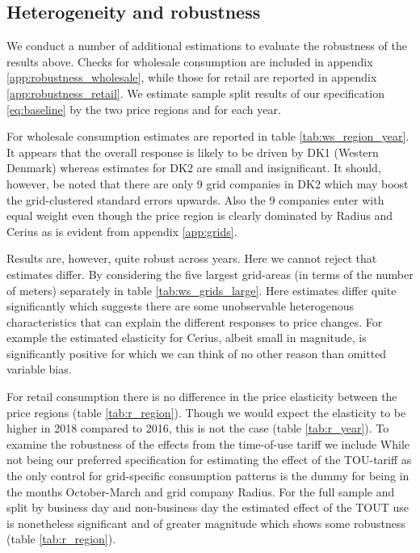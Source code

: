 \subsection{Heterogeneity and robustness}
\label{subsec:r_robustness}
\begin{comment}
Heterogeneous effects
\begin{figure}[H]
  \centering
  \caption{Wholesale elasticity by hour}
  \label{fig:ws_elasticity_hour}
\end{figure}

\begin{figure}[H]
  \centering
  \caption{Wholesale peak-elasticity by log grid size}
  \label{fig:ws_elasticity_grid}
\end{figure}
\end{comment}
We conduct a number of additional estimations to evaluate the robustness of the results above. Checks for wholesale consumption are included in appendix \ref{app:robustness_wholesale}, while those for retail are reported in appendix \ref{app:robustness_retail}. We estimate sample split results of our specification \eqref{eq:baseline} by the two price regions and for each year.
\bigskip\par
For wholesale consumption estimates are reported in table \ref{tab:ws_region_year}. It appears that the overall response is likely to be driven by DK1 (Western Denmark) whereas estimates for DK2 are small and insignificant. It should, however, be noted that there are only 9 grid companies in DK2 which may boost the grid-clustered standard errors upwards. Also the 9 companies enter with equal weight even though the price region is clearly dominated by Radius and Cerius as is evident from appendix \ref{app:grids}.
\par
Results are, however, quite robust across years. Here we cannot reject that estimates differ. By considering the five largest grid-areas (in terms of the number of meters) separately in table \ref{tab:ws_grids_large}. Here estimates differ quite significantly which suggests there are some unobservable heterogenous characteristics that can explain the different responses to price changes. For example the estimated elasticity for Cerius, albeit small in magnitude, is significantly positive for which we can think of no other reason than omitted variable bias.
\par %
For retail consumption there is no difference in the price elasticity between the price regions (table \ref{tab:r_region}). Though we would expect the elasticity to be higher in 2018 compared to 2016, this is not the case (table \ref{tab:r_year}). To examine the robustness of the effects from the time-of-use tariff we include While not being our preferred specification for estimating the effect of the TOU-tariff as the only control for grid-specific consumption patterns is the dummy for being in the months October-March and grid company Radius. For the full sample and split by business day and non-business day the estimated effect of the TOUT use is nonetheless significant and of greater magnitude which shows some robustness (table \ref{tab:r_region}).
